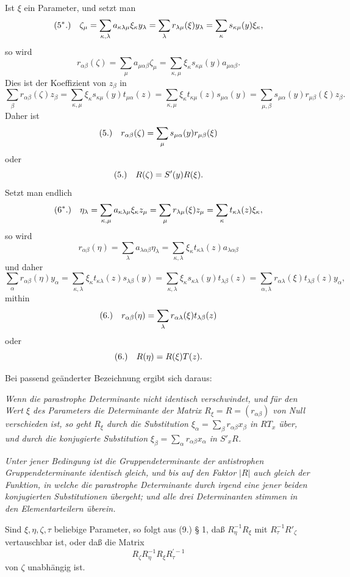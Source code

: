 \documentclass[11pt]{article}
\newcommand{\fnum}[1]{\textup{(\ensuremath{#1}.)}\quad}
\begin{document}
Ist $\xi$ ein Parameter, und setzt man
\[
\fnum{5^*} \zeta_\mu=\sum_{\kappa,\lambda}a_{\kappa\lambda\mu}\xi_\kappa y_\lambda
=\sum_\lambda r_{\lambda\mu}(\xi)y_\lambda
=\sum_\kappa s_{\kappa\mu}(y)\xi_\kappa,
\]
so wird
\[
 r_{\alpha\beta}(\zeta)=\sum_\mu a_{\mu\alpha\beta}\zeta_\mu
 =\sum_{\kappa,\mu}\xi_\kappa s_{\kappa\mu}(y)a_{\mu\alpha\beta}.
\]
Dies ist der Koeffizient von $z_\beta$ in
\[
 \sum_\beta r_{\alpha\beta}(\zeta)z_\beta
 =\sum_{\kappa,\mu}\xi_\kappa s_{\kappa\mu}(y)t_{\mu\alpha}(z)
 =\sum_{\kappa,\mu}\xi_\kappa t_{\kappa\mu}(z)s_{\mu\alpha}(y)
 =\sum_{\mu,\beta}s_{\mu\alpha}(y)r_{\mu\beta}(\xi)z_\beta .
\]
Daher ist
\[
\fnum{5} r_{\alpha\beta}(\zeta)=\sum_\mu s_{\mu\alpha}(y)r_{\mu\beta}(\xi)
\]
oder
\[
\fnum{5} R(\zeta)=S'(y)R(\xi).
\]
Setzt man endlich
\[
\fnum{6^*} \eta_\lambda=\sum_{\kappa,\mu}a_{\kappa\lambda\mu}\xi_\kappa z_\mu
=\sum_\mu r_{\lambda\mu}(\xi)z_\mu
=\sum_\kappa t_{\kappa\lambda}(z)\xi_\kappa,
\]
so wird
\[
 r_{\alpha\beta}(\eta)=\sum_\lambda a_{\lambda\alpha\beta}\eta_\lambda
 =\sum_{\kappa,\lambda}\xi_\kappa t_{\kappa\lambda}(z)a_{\lambda\alpha\beta}
\]
und daher
\[
 \sum_\alpha r_{\alpha\beta}(\eta)y_\alpha
 =\sum_{\kappa,\lambda}\xi_\kappa t_{\kappa\lambda}(z)s_{\lambda\beta}(y)
 =\sum_{\kappa,\lambda}\xi_\kappa s_{\kappa\lambda}(y)t_{\lambda\beta}(z)
 =\sum_{\alpha,\lambda}r_{\alpha\lambda}(\xi)t_{\lambda\beta}(z)y_\alpha,
\]
mithin
\[
\fnum{6} r_{\alpha\beta}(\eta)=\sum_\lambda r_{\alpha\lambda}(\xi)t_{\lambda\beta}(z)
\]
oder
\[
\fnum{6} R(\eta)=R(\xi)T(z).
\]

Bei passend geänderter Bezeichnung ergibt sich daraus:

\emph{Wenn die parastrophe Determinante nicht identisch verschwindet, und für den Wert $\xi$ des Parameters die Determinante der Matrix $R_\xi=R=(r_{\alpha\beta})$ von Null verschieden ist, so geht $R_\xi$ durch die Substitution $\xi_\alpha=\sum_\beta r_{\alpha\beta}x_\beta$ in $RT_x$ über, und durch die konjugierte Substitution $\xi_\beta=\sum_\alpha r_{\alpha\beta}x_\alpha$ in $S'_xR$.}

\emph{Unter jener Bedingung ist die Gruppendeterminante der antistrophen Gruppendeterminante identisch gleich, und bis auf den Faktor $|R|$ auch gleich der Funktion, in welche die parastrophe Determinante durch irgend eine jener beiden konjugierten Substitutionen übergeht; und alle drei Determinanten stimmen in den Elementarteilern überein.}

Sind $\xi,\eta,\zeta,\tau$ beliebige Parameter, so folgt aus (9.) § 1, daß $R_\eta^{-1}R_\xi$ mit $R_\tau^{-1}R'_\zeta$ vertauschbar ist, oder daß die Matrix
\[
 R_\zeta R_\eta^{-1}R_\xi R_\tau^{\prime -1}
\]
von $\zeta$ unabhängig ist.
\end{document}
